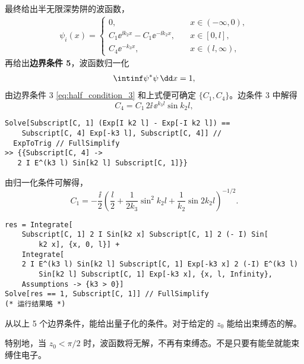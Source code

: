 最终给出半无限深势阱的波函数，
\begin{align}
    \psi_i (x) = 
    \begin{cases}
        0, \quad &x\in (-\infty, 0), \\
        C_1 \ee^{\ii k_2 x} - C_1 \ee^{-\ii k_2 x}, \quad &x\in[0,l],\\
        C_4 \ee^{-k_3 x}, \quad & x\in(l, \infty),
    \end{cases}
\end{align}
再给出\textbf{边界条件 5}，波函数归一化
\begin{eqnarray}
    \intinf \psi^* \psi \, \dd x = 1,
\end{eqnarray}
由边界条件 3 \eqref{eq:half_condition_3} 和上式便可确定 $\{C_1, C_4\}$。边条件 3 中解得
\begin{equation}
    C_4 = C_1 \, 2\ii \,\ee^{k_3 l} \sin k_2 l,
\end{equation}
\begin{lstlisting}
Solve[Subscript[C, 1] (Exp[I k2 l] - Exp[-I k2 l]) == 
    Subscript[C, 4] Exp[-k3 l], Subscript[C, 4]] // 
  ExpToTrig // FullSimplify
>> {{Subscript[C, 4] -> 
   2 I E^(k3 l) Sin[k2 l] Subscript[C, 1]}}
\end{lstlisting}
由归一化条件可解得，
\begin{equation}
    C_1 = -\frac{\ii}2\left(
        \frac l2 + \frac1{2 k_3} \sin^2 k_2 l + \frac1{k_2} \sin 2k_2 l
    \right)^{-1/2}. 
\end{equation}
\begin{lstlisting}
res = Integrate[
    Subscript[C, 1] 2 I Sin[k2 x] Subscript[C, 1] 2 (- I) Sin[
        k2 x], {x, 0, l}] + 
    Integrate[
    2 I E^(k3 l) Sin[k2 l] Subscript[C, 1] Exp[-k3 x] 2 (-I) E^(k3 l)
        Sin[k2 l] Subscript[C, 1] Exp[-k3 x], {x, l, Infinity}, 
    Assumptions -> {k3 > 0}]
Solve[res == 1, Subscript[C, 1]] // FullSimplify
(* 运行结果略 *)
\end{lstlisting}

从以上 5 个边界条件，能给出量子化的条件。对于给定的 $z_0$ 能给出束缚态的解。

特别地，当 $z_0 < \pi/2$ 时，波函数将无解，不再有束缚态。不是只要有能垒就能束缚住电子。


